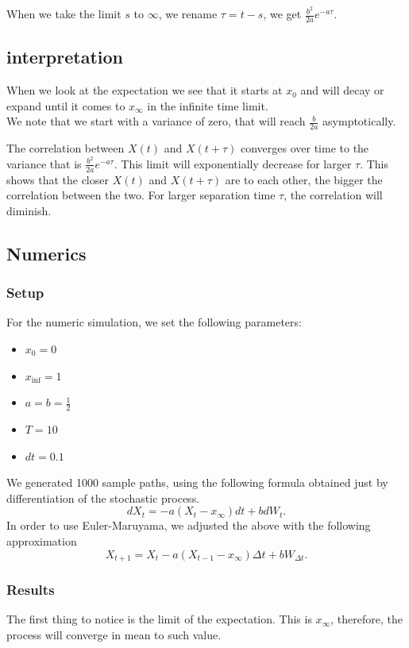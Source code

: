 \documentclass[a4paper,12pt]{article} %
\begin{document}
When we take the limit $s$ to $\infty$, we rename $\tau=t-s$, we get $\frac{b^2}{2a} e^{ -a \tau}$.

\subsection{interpretation}
When we look at the expectation we see that it starts at $x_0$ and will decay or expand until it comes to $x_\infty$ in the infinite time limit.\\

We note that we start with a variance of zero, that will reach $\frac{b}{2a}$ asymptotically.

The correlation between $X(t)$ and $X(t+\tau)$ converges over time to the variance that is $\frac{b^2}{2a} e^{-a\tau}$.  This limit will exponentially decrease for larger $\tau$. This shows that the closer $X(t)$ and $X(t+\tau)$ are to each other, the bigger the correlation between the two. For larger separation time $\tau$, the correlation will diminish.


\subsection{Numerics}
\subsubsection{Setup}
For the numeric simulation, we set the following parameters:
\begin{itemize}
    \item \(x_{0} =0\)
    \item \(x_{\inf }= 1 \)
    \item \(a=b=\frac{1}{2}\)
    \item \(T=10\)
    \item \(dt=0.1\)
\end{itemize}
We generated 1000 sample paths, using the following formula obtained just by differentiation of the stochastic process.
\begin{equation}
    dX_t = - a(X_{t}-x_\infty  )dt +b dW_t.
\end{equation}
In order to use Euler-Maruyama, we adjusted the above with the following approximation
\begin{equation}
    X_{t+1} = X_t - a(X_{t-1}-x_\infty ) \Delta  t+ b W_{\Delta t}.
\end{equation}

\subsubsection{Results}
The first thing to notice is the limit of the expectation. This is \(x_\infty \), therefore, the process will converge in mean to such value.
\end{document}
